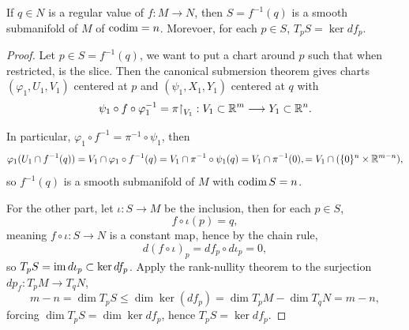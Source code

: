 \begin{theorem}
  If \(q\in N\) is a regular value of \(f:M\to N\), then \(S = f^{-1}(q)\) is a smooth submanifold of \(M\) of \(\operatorname{codim} = n\). Morevoer, for each \(p\in S\), \(T_pS = \ker df_p\).
\end{theorem}
\begin{proof}
  Let \(p\in S = f^{-1}(q)\), we want to put a chart around \(p\) such that  when restricted, is the slice.
  Then the canonical submersion theorem gives charts \((\varphi_1,U_1,V_1)\)  centered at \(p\) and \((\psi_1,X_1,Y_1)\) centered at \(q\) with \[
      \psi_1\circ f\circ\varphi_1^{-1} = \pi\mathord{\upharpoonright}_{V_1}:
      V_1\subset\mathbb{R}^m\longrightarrow Y_1\subset\mathbb{R}^n.
  \] 
  \begin{center}
      
  \end{center}
  In particular, \(\varphi_1\circ f^{-1} = \pi^{-1}\circ\psi_1\), then \begin{align*}
      \varphi_1(U_1\cap f^{-1}(q))
      = V_1\cap\varphi_1\circ f^{-1}(q)
      = V_1\cap\pi^{-1}\circ\psi_1(q)
      = V_1\cap\pi^{-1}(0),
      = V_1\cap(\{0\}^n\times\mathbb{R}^{m-n}),
  \end{align*} so \(f^{-1}(q)\) is a smooth submanifold of \(M\) with \(\operatorname{codim} S = n\).

  For the other part, let \(\iota:S\to M\) be the inclusion, then for each   \(p\in S\), \[
      f\circ\iota(p) = q,
  \] meaning \(f\circ\iota:S\to N\) is a constant map, hence by the chain rule, \[
    d(f\circ\iota)_p = df_p\circ d\iota_p = 0,
  \] so \(T_pS = \operatorname{im} d\iota_p \subset\ker df_p\).
  Apply the rank-nullity theorem to the surjection \(dp_f:T_pM\to T_qN\), \[
    m - n = \dim T_pS
    \leq \dim\ker(df_p)
    = \dim T_pM - \dim T_qN = m - n,
  \] forcing \(\dim T_pS = \dim\ker df_p\), hence \(T_pS = \ker df_p\).
\end{proof}

